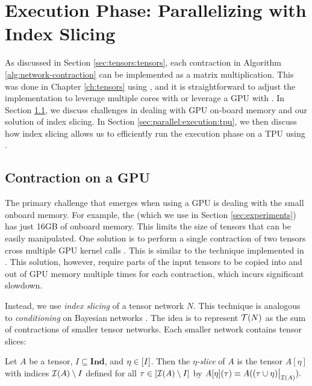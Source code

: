 \section{Execution Phase: Parallelizing with Index Slicing}
\label{sec:parallel:execution}
As discussed in Section \ref{sec:tensors:tensors}, each contraction in Algorithm \ref{alg:network-contraction} can be implemented as a matrix multiplication.
This was done in Chapter \ref{ch:tensors} using  \cite{numpy}, and it is straightforward to adjust the implementation to leverage multiple cores with  or leverage a GPU with  \cite{ABCCDDDGII16}. 
In Section \ref{sec:parallel:execution:gpu}, we discuss challenges in dealing with GPU on-board memory and our solution of index slicing. In Section \ref{sec:parallel:execution:tpu}, we then discuss how index slicing allows us to efficiently run the execution phase on a TPU using  \cite{jax2018github}.

\subsection{Contraction on a GPU}
\label{sec:parallel:execution:gpu}
The primary challenge that emerges when using a GPU is dealing with the small onboard memory. For example, the  (which we use in Section \ref{sec:experiments}) has just 16GB of onboard memory. This limits the size of tensors that can be easily manipulated. One solution is to perform a single contraction of two tensors cross multiple GPU kernel calls \cite{RRBSKH08}. This is similar to the technique implemented in  \cite{FHZ19}. This solution, however, require parts of the input tensors to be copied into and out of GPU memory multiple times for each contraction, which incurs significant slowdown.

Instead, we use \emph{index slicing} \cite{CZHNS18,GK20,VBNHRBM19} of a tensor network $N$. This technique is analogous to \emph{conditioning} on Bayesian networks \cite{darwiche01,dechter99,pearl86,SAS94}. The idea is to represent $\mathcal{T}(N)$ as the sum of contractions of smaller tensor networks. Each smaller network contains tensor slices:

\begin{definition}
Let $A$ be a tensor, $I \subseteq \textbf{Ind}$, and $\eta \in [I]$. Then the \emph{$\eta$-slice} of $A$ is the tensor $A[\eta]$ with indices $\mathcal{I}(A) \setminus I$ defined for all $\tau \in [\mathcal{I}(A) \setminus I]$ by $A[\eta](\tau) \equiv A((\tau \cup \eta)\big|_{\mathcal{I}(A)}).$
\end{definition}

